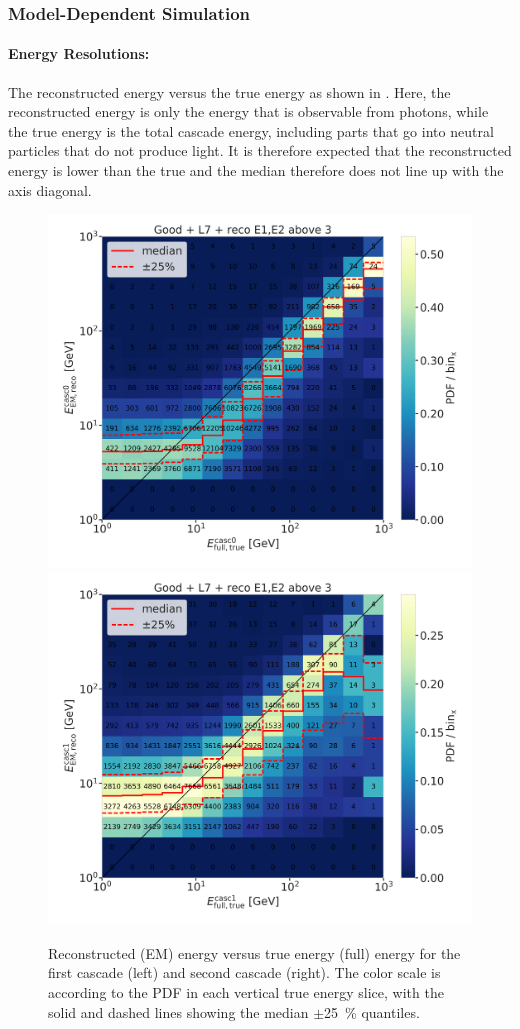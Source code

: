 

\subsubsection{Model-Dependent Simulation}


\paragraph{Energy Resolutions:}

The reconstructed energy versus the true energy as shown in . Here, the reconstructed energy is only the energy that is observable from photons, while the true energy is the total cascade energy, including parts that go into neutral particles that do not produce light. It is therefore expected that the reconstructed energy is lower than the true and the median therefore does not line up with the axis diagonal.

\begin{figure}[h]
	\centering
    \includegraphics[width=0.49\linewidth]{figures/results/190607/resolutions/190607_millipede_level_no_NaNs_NEW_flipped_casc0_reco_energy_vs_casc0_true_energy_reco_above3_step_contours.png}
    \includegraphics[width=0.49\linewidth]{figures/results/190607/resolutions/190607_millipede_level_no_NaNs_NEW_flipped_casc1_reco_energy_vs_casc1_true_energy_reco_above3_step_contours.png}


    \caption[Preliminary two-dimensional reconstructed versus true cascade energy resolutions]{Reconstructed (EM) energy versus true energy (full) energy for the first cascade (left) and second cascade (right). The color scale is according to the PDF in each vertical true energy slice, with the solid and dashed lines showing the median $\pm$\SI{25}{\percent} quantiles.}


\end{figure}


